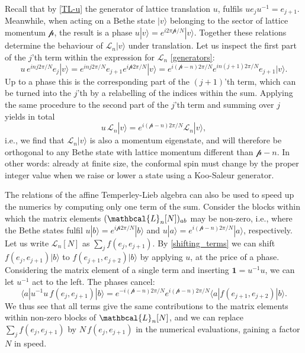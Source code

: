 \documentclass[a4paper,10pt]{article}
\newcommand{\KSgen}{\mathcal{L}}
\newcommand{\LnMat}[1]{\mathbcal{L}_{#1}}
\begin{document}
Recall that by \eqref{TL-u} the generator of lattice translation $u$, fulfils $u e_j u^{-1} = e_{j+1}$. Meanwhile, when acting on a Bethe state $|v\rangle$ belonging to the sector of lattice momentum ${\mathcal p}$, the result is a phase $u|v\rangle=e^{i 2\pi {\mathcal p} /N}|v\rangle$. Together these relations determine the behaviour of ${\mathcal L}_n|v\rangle$ under translation. Let us inspect the first part of the $j$'th term within the expression for $\KSgen_n$ \eqref{generators}: 
\begin{equation}\label{shifting_terms}
u \, e^{inj2\pi/N} e_j |v\rangle %
 = e^{inj2\pi/N}  e_{j+1} e^{i {\mathcal p} 2\pi/N} |v\rangle = e^{i ({\mathcal p} -n)2\pi/N}  e^{in(j+1)2\pi/N}  e_{j+1}|v\rangle .
\end{equation}
Up to a phase this is the corresponding part of the $(j+1)$'th term, which can be turned into the $j$'th by a relabelling of the indices within the sum. Applying the same procedure to the second part of the $j$'th term and summing over $j$ yields in total
\begin{equation}
u\, \KSgen_n |v\rangle = e^{i({\mathcal p} - n)2\pi/N}   \KSgen_n |v\rangle,
\end{equation} 
i.e., we find that ${\mathcal L}_n |v\rangle $ is also a momentum eigenstate, and will therefore be orthogonal to any Bethe state with lattice momentum different than ${\mathcal p}-n$. In other words: already at finite size, the conformal spin must change by the proper integer value when we raise or lower a state using a Koo-Saleur generator. 



The relations of the affine Temperley-Lieb algebra can also be used to speed up the numerics by computing only one term of the sum. Consider the blocks within which the matrix elements $(\LnMat{n}[N])_{ab}$ may be non-zero, i.e., where the Bethe states fulfil
$u | b \rangle=e^{i {\mathcal p} 2\pi/N} | b \rangle $ and $u |a \rangle = e^{i ({\mathcal p}-n) 2\pi/N} | a \rangle$, respectively. 
%
Let us write $\KSgen_n[N]$ as $\sum_j f(e_j,e_{j+1})$. By \eqref{shifting_terms} we can shift $f(e_j,e_{j+1})|b\rangle$ to $f(e_{j+1},e_{j+2})|b\rangle$ by applying $u$, at the price of a phase. Considering the matrix element of a single term and inserting  $\mathbf{1}=u^{-1}u$, we can let $u^{-1}$ act to the left. The phases cancel:
\begin{equation}
\langle a | u^{-1}   u\,  f(e_{j},e_{j+1})  |b \rangle = e^{-i({\mathcal p} - n)2\pi/N}   e^{i({\mathcal p} - n)2\pi/N}   \langle a | f(e_{j+1},e_{j+2})  |b \rangle .
\end{equation} 
We thus see that all terms give the same contributions to the matrix elements within non-zero blocks of $\LnMat{n}[N]$, and we can replace $\sum_j  f(e_j,e_{j+1})$ by $N\, f(e_j,e_{j+1})$ in the numerical evaluations, gaining a factor $N$ in speed.
\end{document}
